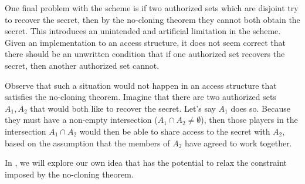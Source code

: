 One final problem with the scheme is if two authorized sets which are disjoint try to recover the secret, then by the no-cloning theorem they cannot both obtain the secret. This introduces an unintended and artificial limitation in the scheme. Given an implementation to an access structure, it does not seem correct that there should be an unwritten condition that if one authorized set recovers the secret, then another authorized set cannot. 

Observe that such a situation would not happen in an access structure that satisfies the no-cloning theorem. Imagine that there are two authorized sets $A_1,A_2$ that would both like to recover the secret. Let's say $A_1$ does so. Because they must have a non-empty intersection ($A_1 \cap A_2 \neq \emptyset$), then those players in the intersection $A_1 \cap A_2$ would then be able to share access to the secret with $A_2$, based on the assumption that the members of $A_2$ have agreed to work together.

In , we will explore our own idea that has the potential to relax the constraint imposed by the no-cloning theorem.
